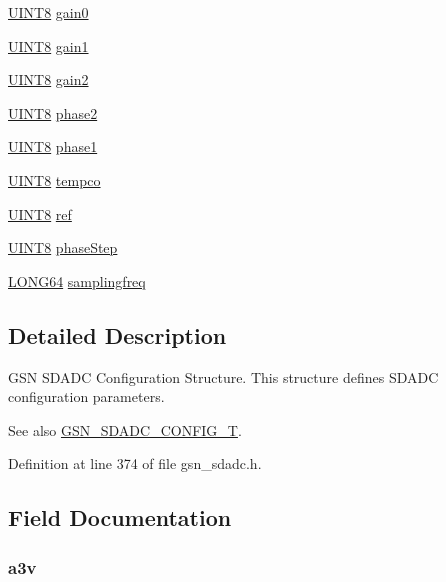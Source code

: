 \begin{DoxyCompactItemize}
\item 
\hyperlink{a00660_gab27e9918b538ce9d8ca692479b375b6a}{UINT8} \hyperlink{a00213_ac501092e8065544ab192c666c655af11}{gain0}
\item 
\hyperlink{a00660_gab27e9918b538ce9d8ca692479b375b6a}{UINT8} \hyperlink{a00213_ad5e95276535516cd6b67fcd9885de9f3}{gain1}
\item 
\hyperlink{a00660_gab27e9918b538ce9d8ca692479b375b6a}{UINT8} \hyperlink{a00213_ac11903dcfccbcf3d6f5c569dd5840e96}{gain2}
\item 
\hyperlink{a00660_gab27e9918b538ce9d8ca692479b375b6a}{UINT8} \hyperlink{a00213_a5473efc90b3e46bba821d8207bc33fbe}{phase2}
\item 
\hyperlink{a00660_gab27e9918b538ce9d8ca692479b375b6a}{UINT8} \hyperlink{a00213_af252e89f6bf293b62d258d738a0fdce4}{phase1}
\item 
\hyperlink{a00660_gab27e9918b538ce9d8ca692479b375b6a}{UINT8} \hyperlink{a00213_a8709e7f98588a98949c72e3e42f6ef85}{tempco}
\item 
\hyperlink{a00660_gab27e9918b538ce9d8ca692479b375b6a}{UINT8} \hyperlink{a00213_a9ff4a6d9a5ba6de301e47626826b6068}{ref}
\item 
\hyperlink{a00660_gab27e9918b538ce9d8ca692479b375b6a}{UINT8} \hyperlink{a00213_a893016d6c414c37486cda1f0f7a9d3a4}{phaseStep}
\item 
\hyperlink{a00660_gae57305825c7d329ad8a3065ae045e875}{LONG64} \hyperlink{a00213_a4ca9e91970ca83242fe92d354984831d}{samplingfreq}
\end{DoxyCompactItemize}


\subsection{Detailed Description}
GSN SDADC Configuration Structure. This structure defines SDADC configuration parameters. 

\begin{DoxySeeAlso}{See also}
\hyperlink{a00652_ga74fd69b30c22ac53de45e0914b171164}{GSN\_\-SDADC\_\-CONFIG\_\-T}. 
\end{DoxySeeAlso}


Definition at line 374 of file gsn\_\-sdadc.h.



\subsection{Field Documentation}
\hypertarget{a00213_af7e5e603dcaafcd8d75988a25febe87b}{
\subsubsection[{a3v}]{ {\bf a3v}}}
\label{a00213_af7e5e603dcaafcd8d75988a25febe87b}


